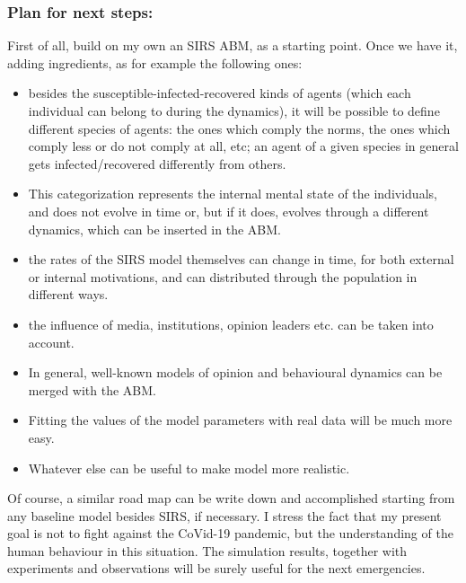 \documentclass{article}
\begin{document}
\subsubsection*{Plan for next steps:} First of all, build on my own an SIRS ABM, as a starting point. Once we have it, adding ingredients, as for example the following ones:

\begin{itemize}
    \item besides the susceptible-infected-recovered kinds of agents (which each individual can belong to during the dynamics), it will be possible to define different species of agents: the ones which comply the norms, the ones which comply less or do not comply at all, etc; an agent of a given species in general gets infected/recovered differently from others.
    \item This categorization represents the internal mental state of the individuals, and does not evolve in time or, but if it does, evolves through a different dynamics, which can be inserted in the ABM.
    \item the rates of the SIRS model themselves can change in time, for both external or internal motivations, and can distributed through the population in different ways.
    \item the influence of media, institutions, opinion leaders etc. can be taken into account.
    \item In general, well-known models of opinion and behavioural dynamics can be merged with the ABM.
    \item Fitting the values of the model parameters with real data will be much more easy.
    \item Whatever else can be useful to make model more realistic.
\end{itemize}

Of course, a similar road map can be write down and accomplished starting from any baseline model besides SIRS, if necessary. I stress the fact that my present goal is not to fight against the CoVid-19 pandemic, but the understanding of the human behaviour in this situation. The simulation results, together with experiments and observations will be surely useful for the next emergencies.

\ 
\end{document}
